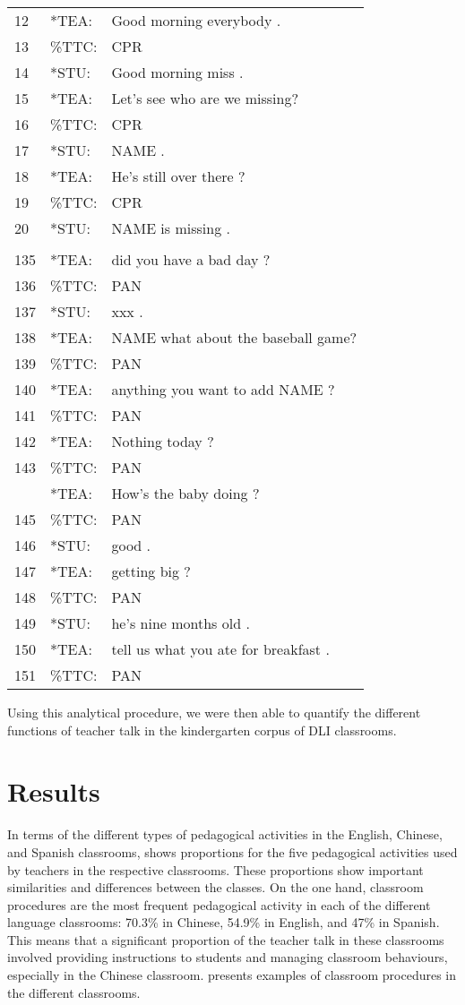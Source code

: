 \documentclass[output=paper,chinesefont]{langscibook}
\begin{document}
\ea
\begin{tabular}[t]{@{}lll@{}}
12  &  *TEA: & {Good morning everybody .}\\
13  &  \%TTC: & CPR\\
14  &  *STU: & {Good morning miss .}\\
15  &  *TEA: & {Let's see who are we missing?}\\
16  &  \%TTC: & CPR\\
17  &  *STU: & {NAME .}\\
18  &  *TEA: & {He's still over there ?}\\
19  &  \%TTC: & CPR\\
20  &  *STU: & {NAME is missing .}\\
\\
135  & *TEA: & did you have a bad day ?\\
136  & \%TTC: & PAN\\
137  & *STU: & xxx .\\
138  & *TEA: & NAME what about the baseball game?\\
139  & \%TTC: & PAN\\
140  & *TEA: & anything you want to add NAME ?\\
141  & \%TTC: & PAN\\
142  & *TEA: & Nothing today ?\\
143  & \%TTC: & PAN\\\tablevspace
144  & *TEA: & How's the baby doing ?\\
145  & \%TTC: & PAN\\
146  & *STU: & good .\\
147  & *TEA: & getting big ?\\
148  & \%TTC: & PAN\\
149  & *STU: & he's nine months old .\\
150  & *TEA: & tell us what you ate for breakfast .\\
151  & \%TTC: & PAN\\
\end{tabular}
\z

Using this analytical procedure, we were then able to quantify the different functions of teacher talk in the kindergarten corpus of DLI classrooms.

\section{Results}

In terms of the different types of pedagogical activities in the English, Chinese, and Spanish classrooms,  shows proportions for the five pedagogical activities used by teachers in the respective classrooms. These proportions show important similarities and differences between the classes. On the one hand, classroom procedures are the most frequent pedagogical activity in each of the different language classrooms: 70.3\% in Chinese, 54.9\% in English, and 47\% in Spanish. This means that a significant proportion of the teacher talk in these classrooms involved providing instructions to students and managing classroom behaviours, especially in the Chinese classroom.  presents examples of classroom procedures in the different classrooms.
\end{document}
